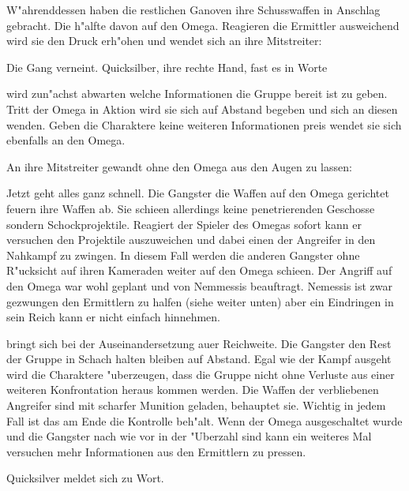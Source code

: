 
W"ahrenddessen haben die restlichen Ganoven ihre Schusswaffen in Anschlag gebracht. Die h"alfte davon auf den Omega. Reagieren die Ermittler ausweichend wird sie den Druck erh"ohen und wendet sich an ihre Mitstreiter:


Die Gang verneint. Quicksilber, ihre rechte Hand, fast es in Worte 

\xlsn{} wird zun"achst abwarten welche Informationen die Gruppe bereit ist zu geben. Tritt der Omega in Aktion wird sie sich auf Abstand begeben und sich an diesen wenden. Geben die Charaktere keine weiteren Informationen preis wendet sie sich ebenfalls an den Omega.


An ihre Mitstreiter gewandt ohne den Omega aus den Augen zu lassen:


Jetzt geht alles ganz schnell. Die Gangster die Waffen auf den Omega gerichtet feuern ihre Waffen ab. Sie schie\3en allerdings keine penetrierenden Geschosse sondern Schockprojektile. Reagiert der Spieler des Omegas sofort kann er versuchen den Projektile auszuweichen und dabei einen der Angreifer in den Nahkampf zu zwingen. In diesem Fall werden die anderen Gangster ohne R"ucksicht auf ihren Kameraden weiter auf den Omega schie\3en. Der Angriff auf den Omega war wohl geplant und von Nemmessis beauftragt. Nemessis ist zwar gezwungen den Ermittlern zu halfen (siehe weiter unten) aber ein Eindringen in sein Reich kann er nicht einfach hinnehmen. 

\xlsn{} bringt sich bei der Auseinandersetzung au\3er Reichweite. Die Gangster den Rest der Gruppe in Schach halten bleiben auf Abstand. Egal wie der Kampf ausgeht wird \xlsn{} die Charaktere "uberzeugen, dass die Gruppe nicht ohne Verluste aus einer weiteren Konfrontation heraus kommen werden. Die Waffen der verbliebenen Angreifer sind mit scharfer Munition geladen, behauptet sie. Wichtig in jedem Fall ist das \xlsn{} am Ende die Kontrolle beh"alt. Wenn der Omega ausgeschaltet wurde und die Gangster nach wie vor in der "Uberzahl sind kann \xlsn{} ein weiteres Mal versuchen mehr Informationen aus den Ermittlern zu pressen.

Quicksilver meldet sich zu Wort. 


